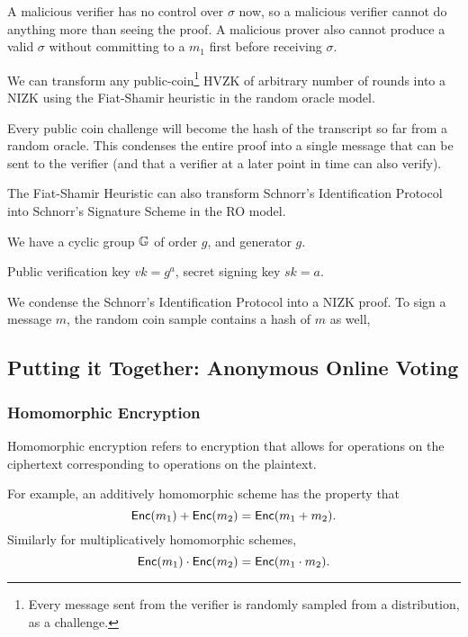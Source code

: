 A malicious verifier has no control over $\sigma$ now, so a malicious verifier cannot do anything more than seeing the proof. A malicious prover also cannot produce a valid $\sigma$ without committing to a $m_1$ first before receiving $\sigma$.

We can transform any public-coin\footnote{Every message sent from the verifier is randomly sampled from a distribution, as a challenge.} HVZK of arbitrary number of rounds into a NIZK using the Fiat-Shamir heuristic in the random oracle model.

Every public coin challenge will become the hash of the transcript so far from a random oracle. This condenses the entire proof into a single message that can be sent to the verifier (and that a verifier at a later point in time can also verify).

\begin{example}
    The Fiat-Shamir Heuristic can also transform Schnorr's Identification Protocol into Schnorr's Signature Scheme in the RO model.

    We have a cyclic group $\mathbb G$ of order $g$, and generator $g$.

    Public verification key $vk = g^a$, secret signing key $sk = a$.

    We condense the Schnorr's Identification Protocol into a NIZK proof. To sign a message $m$, the random coin sample contains a hash of $m$ as well, 
\end{example}

\subsection{Putting it Together: Anonymous Online Voting}
\subsubsection{Homomorphic Encryption}
Homomorphic encryption refers to encryption that allows for operations on the ciphertext corresponding to operations on the plaintext.

For example, an additively homomorphic scheme has the property that
\[\operatorname{\mathsf{Enc}}(m_1) + \operatorname{\mathsf{Enc}}(m_2) = \operatorname{\mathsf{Enc}}(m_1 + m_2).\]
Similarly for multiplicatively homomorphic schemes,
\[\operatorname{\mathsf{Enc}}(m_1) \cdot \operatorname{\mathsf{Enc}}(m_2) = \operatorname{\mathsf{Enc}}(m_1 \cdot m_2).\]

